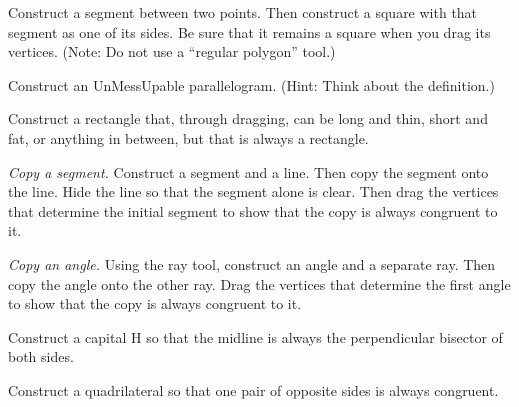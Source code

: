 \begin{prob}
Construct a segment between two points.  Then construct a square with that segment as one of its sides.  Be sure that it remains a square when you drag its vertices.  (Note:  Do not use a ``regular polygon'' tool.)
\end{prob}

\begin{prob}
Construct an UnMessUpable parallelogram.  (Hint:  Think about the definition.)  
\end{prob}

\begin{prob}
Construct a rectangle that, through dragging, can be long and thin, short and fat, or anything in between, but that is always a rectangle.
\end{prob}

\begin{prob}
\emph{Copy a segment.}  Construct a segment and a line.  Then copy the segment onto the line.  Hide the line so that the segment alone is clear.  Then drag the vertices that determine the initial segment to show that the copy is always congruent to it.  
\end{prob}

\begin{prob}
\emph{Copy an angle.}  Using the ray tool, construct an angle and a separate ray.  Then copy the angle onto the other ray.  Drag the vertices that determine the first angle to show that the copy is always congruent to it.  
\end{prob}

\begin{prob}
Construct a capital H so that the midline is always the perpendicular bisector of both sides.  
\end{prob}

\begin{prob}
Construct a quadrilateral so that one pair of opposite sides is always congruent.  
\end{prob}





